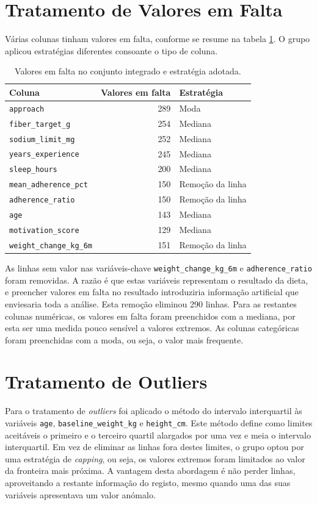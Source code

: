 \section{Tratamento de Valores em Falta}
Várias colunas tinham valores em falta, conforme se resume na tabela \ref{tab:nulos}. O grupo aplicou estratégias diferentes consoante o tipo de coluna.

\begin{table}[h]
\centering
\begin{tabular}{|l|r|l|}
\hline
\textbf{Coluna} & \textbf{Valores em falta} & \textbf{Estratégia} \\
\hline
\texttt{approach} & 289 & Moda \\
\texttt{fiber\_target\_g} & 254 & Mediana \\
\texttt{sodium\_limit\_mg} & 252 & Mediana \\
\texttt{years\_experience} & 245 & Mediana \\
\texttt{sleep\_hours} & 200 & Mediana \\
\texttt{mean\_adherence\_pct} & 150 & Remoção da linha \\
\texttt{adherence\_ratio} & 150 & Remoção da linha \\
\texttt{age} & 143 & Mediana \\
\texttt{motivation\_score} & 129 & Mediana \\
\texttt{weight\_change\_kg\_6m} & 151 & Remoção da linha \\
\hline
\end{tabular}
\caption{Valores em falta no conjunto integrado e estratégia adotada.}
\label{tab:nulos}
\end{table}

As linhas sem valor nas variáveis-chave \texttt{weight\_change\_kg\_6m} e \texttt{adherence\_ratio} foram removidas. A razão é que estas variáveis representam o resultado da dieta, e preencher valores em falta no resultado introduziria informação artificial que enviesaria toda a análise. Esta remoção eliminou 290 linhas. Para as restantes colunas numéricas, os valores em falta foram preenchidos com a mediana, por esta ser uma medida pouco sensível a valores extremos. As colunas categóricas foram preenchidas com a moda, ou seja, o valor mais frequente.

\section{Tratamento de Outliers}
Para o tratamento de \textit{outliers} foi aplicado o método do intervalo interquartil às variáveis \texttt{age}, \texttt{baseline\_weight\_kg} e \texttt{height\_cm}. Este método define como limites aceitáveis o primeiro e o terceiro quartil alargados por uma vez e meia o intervalo interquartil. Em vez de eliminar as linhas fora destes limites, o grupo optou por uma estratégia de \textit{capping}, ou seja, os valores extremos foram limitados ao valor da fronteira mais próxima. A vantagem desta abordagem é não perder linhas, aproveitando a restante informação do registo, mesmo quando uma das suas variáveis apresentava um valor anómalo.


